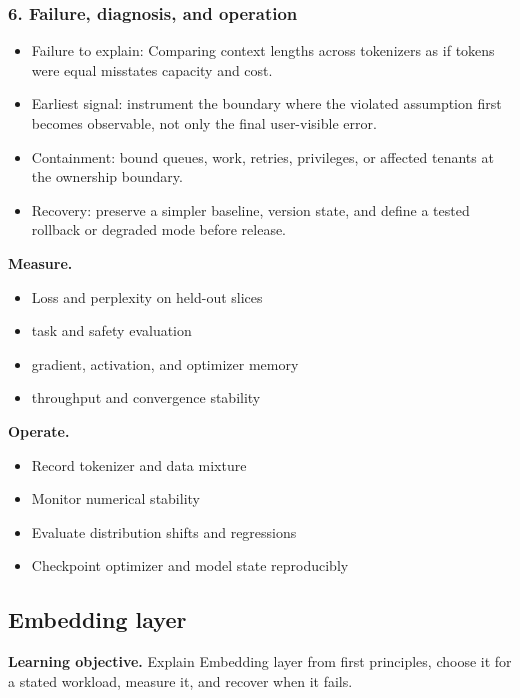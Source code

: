 \subsubsection*{6. Failure, diagnosis, and operation}
\begin{itemize}
\item Failure to explain: Comparing context lengths across tokenizers as if tokens were equal misstates capacity and cost.
\item Earliest signal: instrument the boundary where the violated assumption first becomes observable, not only the final user-visible error.
\item Containment: bound queues, work, retries, privileges, or affected tenants at the ownership boundary.
\item Recovery: preserve a simpler baseline, version state, and define a tested rollback or degraded mode before release.
\end{itemize}
\textbf{Measure.}\begin{itemize}
\item Loss and perplexity on held-out slices
\item task and safety evaluation
\item gradient, activation, and optimizer memory
\item throughput and convergence stability
\end{itemize}
\textbf{Operate.}\begin{itemize}
\item Record tokenizer and data mixture
\item Monitor numerical stability
\item Evaluate distribution shifts and regressions
\item Checkpoint optimizer and model state reproducibly
\end{itemize}
\subsection{Embedding layer}
\textbf{Learning objective.} Explain Embedding layer from first principles, choose it for a stated workload, measure it, and recover when it fails.
